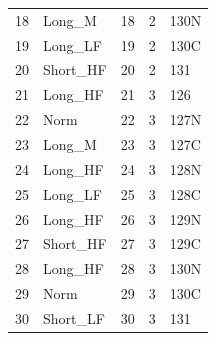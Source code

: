 \begin{table}[!ht]
\begin{tabular}{lllll}
18                                        & Long\_M            & 18                    & 2                & 130N      \\
19                                        & Long\_LF           & 19                    & 2                & 130C      \\
20                                        & Short\_HF          & 20                    & 2                & 131       \\
21                                        & Long\_HF           & 21                    & 3                & 126       \\
22                                        & Norm               & 22                    & 3                & 127N      \\
23                                        & Long\_M            & 23                    & 3                & 127C      \\
24                                        & Long\_HF           & 24                    & 3                & 128N      \\
25                                        & Long\_LF           & 25                    & 3                & 128C      \\
26                                        & Long\_HF           & 26                    & 3                & 129N      \\
27                                        & Short\_HF          & 27                    & 3                & 129C      \\
28                                        & Long\_HF           & 28                    & 3                & 130N      \\
29                                        & Norm               & 29                    & 3                & 130C      \\
30                                        & Short\_LF          & 30                    & 3                & 131      
\end{tabular}
\end{table}

